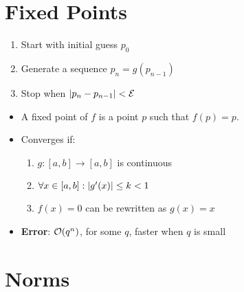\documentclass[9pt, letterpaper]{extarticle}
\newcommand{\bigEps}{\mathcal{E}}
\begin{document}
\begin{multicols*}{3}

  \section{Fixed Points}
  \begin{enumerate}
    \item Start with initial guess $p_0$
    \item Generate a sequence $p_n = g(p_{n-1})$
    \item Stop when $\abs{p_n - p_{n-1}} < \bigEps$
  \end{enumerate}
  \begin{itemize}
    \item A fixed point of $f$ is a point $p$ such that $f(p) = p$.
    \item Converges if:
      \begin{enumerate}
        \item $g:[a,b] \to [a,b]$ is continuous
        \item $\forall x \in [a,b]: \abs{g'(x)} \leq k < 1 $
        \item $f(x) = 0$ can be rewritten as $g(x) = x$
      \end{enumerate}
    \item \textbf{Error}: $\order{q^n}$, for some $q$, faster when $q$ is small
  \end{itemize}

  \section{Norms}


\end{multicols*}
\end{document}

